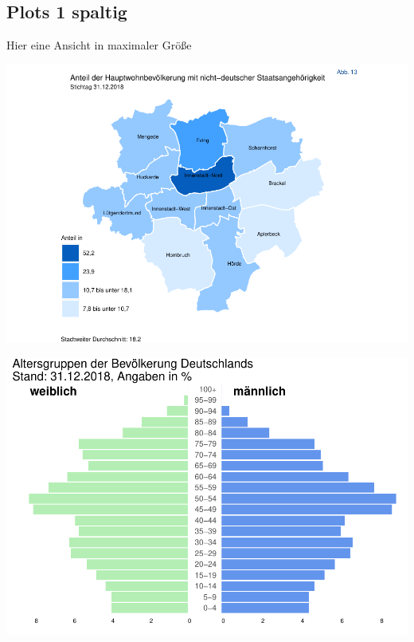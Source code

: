 \documentclass[
  a4paper,
  twoside]{article}
\begin{document}
\newpage

\hypertarget{plots-1-spaltig}{%
\subsection{Plots 1 spaltig}\label{plots-1-spaltig}}

Hier eine Ansicht in maximaler Größe

\includegraphics[width=1\linewidth]{2021-03-02_Beispiel_files/figure-latex/unnamed-chunk-3-1}

\vspace{5mm}

\includegraphics[width=1\linewidth]{2021-03-02_Beispiel_files/figure-latex/plot Pyramide 1 spaltig-1}

\newpage
\end{document}
